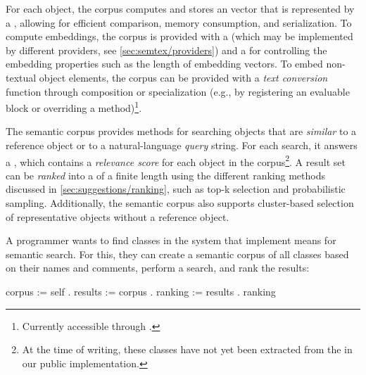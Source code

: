 For each object, the corpus computes and stores an  vector that is represented by a , allowing for efficient comparison, memory consumption, and serialization.
To compute embeddings, the corpus is provided with a  (which may be implemented by different providers, see \cref{sec:semtex/providers}) and a  for controlling the embedding properties such as the length of embedding vectors.
To embed non-textual object elements, the corpus can be provided with a \emph{text conversion} function through composition or specialization (e.g., by registering an evaluable block or overriding a method)\footnote{Currently accessible through .}.

The semantic corpus provides methods for searching objects that are \emph{similar} to a reference object or to a natural-language \emph{query} string.
For each search, it answers a , which contains a \emph{relevance score} for each object in the corpus\footnote{At the time of writing, these classes have not yet been extracted from the  in our public implementation.}.
A result set can be \emph{ranked} into a  of a finite length using the different ranking methods discussed in \cref{sec:suggestions/ranking}, such as top-k selection and probabilistic sampling.
Additionally, the semantic corpus also supports cluster-based selection of representative objects without a reference object.

\begin{example}[5]
	A programmer wants to find classes in the system that implement means for semantic search.
	For this, they can create a semantic corpus of all classes based on their names and comments, perform a search, and rank the results:

	\begin{multicode}
		corpus := self   \newline
		\null\qquad	{}  \newline
		\null\qquad	{} . \newline
		results := corpus  . \newline
		ranking := results  . \newline
		ranking 
	\end{multicode}
\end{example}

